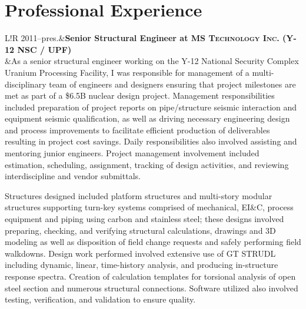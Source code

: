 \documentclass[11pt,letterpaper]{article}
\newcommand\VRule{\color{lightgray}\vrule width 0.5pt}
\begin{document}
\section*{Professional Experience}
\begin{tabular}{L!{\VRule}R}
2011--pres.&{\bf Senior Structural Engineer at \fontsize{12}{12}\textsc{MS Technology Inc. (Y-12 NSC / UPF)}}\\
&As a senior structural engineer working on the Y-12 National Security Complex Uranium Processing Facility, I was responsible for management of a multi-disciplinary team of engineers and designers ensuring that project milestones are met as part of a \$6.5B nuclear design project. Management responsibilities included preparation of project reports on pipe/structure seismic interaction and equipment seismic qualification, as well as driving necessary engineering design and process improvements to facilitate efficient production of deliverables resulting in project cost savings. Daily responsibilities also involved assisting and mentoring junior engineers. Project management involvement included estimation, scheduling, assignment, tracking of design activities, and reviewing interdiscipline and vendor submittals.
\vspace{0.6em}
\par
Structures designed included platform structures and multi-story modular structures supporting turn-key systems comprised of mechanical, EI\&C, process equipment and piping using carbon and stainless steel; these designs involved preparing, checking, and verifying structural calculations, drawings and 3D modeling as well as disposition of field change requests and safely performing field walkdowns. Design work performed involved extensive use of GT STRUDL including dynamic, linear, time-history analysis, and producing in-structure response spectra. Creation of calculation templates for torsional analysis of open steel section and numerous structural connections. Software utilized also involved testing, verification, and validation to ensure quality.
\end{tabular}
\end{document}
